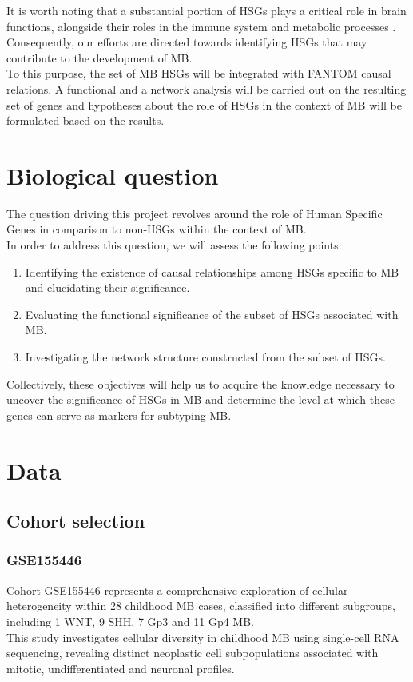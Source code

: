 \documentclass[10pt]{SelfArx} %
\begin{document}
It is worth noting that a substantial portion of HSGs plays a critical role in brain functions, alongside their roles in the immune system and metabolic processes \cite{bitar2019genes}.\\
Consequently, our efforts are directed towards identifying HSGs that may contribute to the development of MB. \\
To this purpose, the set of MB HSGs will be integrated with FANTOM \cite{fantom5} causal relations. A functional and a network analysis will be carried out on the resulting set of genes and hypotheses about the role of HSGs in the context of MB will be formulated based on the results. \\

\section{Biological question}\label{sec:biological_question}
The question driving this project revolves around the role of Human Specific Genes in comparison to non-HSGs within the context of MB. \\
In order to address this question, we will assess the following points: 
\begin{enumerate}
    \item Identifying the existence of causal relationships among HSGs specific to MB and elucidating their significance. 
    \item Evaluating the functional significance of the subset of HSGs associated with MB.
    \item Investigating the network structure constructed from the subset of HSGs. 
\end{enumerate}
Collectively, these objectives will help us to acquire the knowledge necessary to uncover the significance of HSGs in MB and determine the level at which these genes can serve as markers for subtyping MB.

\section{Data}\label{sec:data}

\subsection{Cohort selection}\label{sec:cohort_selection}

\subsubsection{GSE155446}\label{sec:GSE155446}
Cohort GSE155446 \cite{riemondy2022neoplastic} represents a comprehensive exploration of cellular heterogeneity within 28 childhood MB cases, classified into different subgroups, including 1 WNT, 9 SHH, 7 Gp3 and 11 Gp4 MB. \\
This study investigates cellular diversity in childhood MB using single-cell RNA sequencing, revealing distinct neoplastic cell subpopulations associated with mitotic, undifferentiated and neuronal profiles. 
\end{document}

